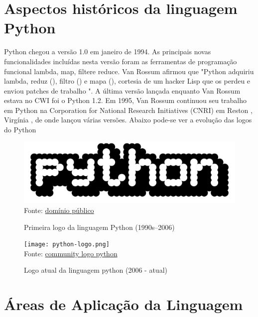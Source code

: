     \newpage
    \section{Aspectos hist\'{o}ricos da linguagem Python}
        
        Python chegou a versão 1.0 em janeiro de 1994. As principais novas funcionalidades incluídas nesta versão foram as ferramentas de programação funcional lambda, map, filtere reduce. Van Rossum afirmou que "Python adquiriu lambda, reduz (), filtro () e mapa (), cortesia de um hacker Lisp que os perdeu e enviou patches de trabalho ". \cite{Int02}
        A última versão lançada enquanto Van Rossum estava no CWI foi o Python 1.2. Em 1995, Van Rossum continuou seu trabalho em Python na Corporation for National Research Initiatives (CNRI) em Reston , Virgínia , de onde lançou várias versões. Abaixo pode-se ver a evolução das logos do Python
        
    \begin{figure}[H]
    \begin{center}
        \caption{Primeira logo da linguagem Python (1990s–2006)} \label{ling1}
        \includegraphics[width=12cm]{Pictures/primeira-logo-python.png} \\
        {\tiny \sf Fonte: \href{https://commons.wikimedia.org/wiki/File:Python_logo_1990s.svg}{domínio público} }
    \end{center}
   \end{figure}
   

   \begin{figure}[H]
    \begin{center}
        \caption{Logo atual da linguagem python (2006 - atual)} \label{ling1}
        \texttt{[image: python-logo.png]} \\
        {\tiny \sf Fonte: \href{https://www.python.org/community/logos/}{community logo python} }
    \end{center}
   \end{figure}
    
   \newpage
   \section{\'{A}reas de Aplica\c{c}\~{a}o da Linguagem}
   

